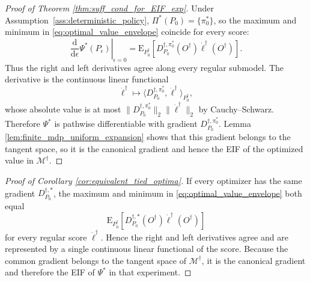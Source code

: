 \documentclass[12pt]{article}
\theoremstyle{remark}\newtheorem{remark}[theorem]{Remark}\theoremstyle{plain}
\newcommand{\E}{\mathrm{E}}
\begin{document}
\begin{proof}[Proof of Theorem \ref{thm:suff_cond_for_EIF_exp}]
    Under Assumption~\ref{ass:deterministic_policy},
    $\Pi^*(P_0)=\{\pi_0^*\}$, so the maximum and minimum in
    \eqref{eq:optimal_value_envelope} coincide for every score:
    \[
        \left.\frac{\mathrm d}{\mathrm d\epsilon}
        \Psi^*(P_\epsilon)\right|_{\epsilon=0}
        =
        \E_{P_0^\dagger}\!\left[
        D_{P_0}^{\dagger,\pi_0^*}(O^\dagger)
        \dot\ell^\dagger(O^\dagger)\right].
    \]
    Thus the right and left derivatives agree along every regular
    submodel.  The derivative is the continuous linear functional
    \[
        \dot\ell^\dagger\longmapsto
        \langle D_{P_0}^{\dagger,\pi_0^*},
        \dot\ell^\dagger\rangle_{P_0^\dagger},
    \]
    whose absolute value is at most
    $\|D_{P_0}^{\dagger,\pi_0^*}\|_2
      \|\dot\ell^\dagger\|_2$ by Cauchy--Schwarz.
    Therefore $\Psi^*$ is pathwise differentiable with gradient
    $D_{P_0}^{\dagger,\pi_0^*}$.  Lemma
    \ref{lem:finite_mdp_uniform_expansion} shows that this gradient
    belongs to the tangent space, so it is the canonical gradient and
    hence the EIF of the optimized value in
    $\mathcal M^\dagger$.
\end{proof}

\begin{proof}[Proof of Corollary
\ref{cor:equivalent_tied_optima}]
    If every optimizer has the same gradient
    $D_{P_0}^{\dagger,*}$, the maximum and minimum in
    \eqref{eq:optimal_value_envelope} both equal
    \[
        \E_{P_0^\dagger}\!\left[
        D_{P_0}^{\dagger,*}(O^\dagger)
        \dot\ell^\dagger(O^\dagger)\right]
    \]
    for every regular score $\dot\ell^\dagger$.  Hence the right and
    left derivatives agree and are represented by a single
    continuous linear functional of the score.  Because the common
    gradient belongs to the tangent space of
    $\mathcal M^\dagger$, it is the canonical gradient and therefore
    the EIF of $\Psi^*$ in that experiment.
\end{proof}
\end{document}

